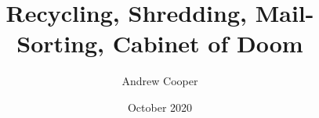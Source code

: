 \title{Recycling, Shredding, Mail-Sorting, Cabinet of Doom}
\author{Andrew Cooper}
\date{October 2020}
\maketitle
